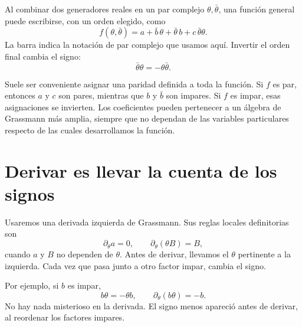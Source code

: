 Al combinar dos generadores reales en un par complejo \(\theta,\bar\theta\), una función general puede escribirse, con un orden elegido, como
\begin{equation}
f(\theta,\bar\theta)
=a+\bar b\,\theta+\bar\theta\,b+c\,\bar\theta\theta.
\end{equation}
La barra indica la notación de par complejo que usamos aquí. Invertir el orden final cambia el signo:
\begin{equation}
\bar\theta\theta=-\theta\bar\theta.
\end{equation}

Suele ser conveniente asignar una paridad definida a toda la función. Si \(f\) es par, entonces \(a\) y \(c\) son pares, mientras que \(b\) y \(\bar b\) son impares. Si \(f\) es impar, esas asignaciones se invierten. Los coeficientes pueden pertenecer a un álgebra de Grassmann más amplia, siempre que no dependan de las variables particulares respecto de las cuales desarrollamos la función.

\begin{classroomqa}
\end{classroomqa}

\section{Derivar es llevar la cuenta de los signos}

Usaremos una derivada izquierda de Grassmann. Sus reglas locales definitorias son
\begin{equation}
\partial_\theta a=0,
\qquad
\partial_\theta(\theta B)=B,
\end{equation}
cuando \(a\) y \(B\) no dependen de \(\theta\). Antes de derivar, llevamos el \(\theta\) pertinente a la izquierda. Cada vez que pasa junto a otro factor impar, cambia el signo.

Por ejemplo, si \(b\) es impar,
\begin{equation}
b\theta=-\theta b,
\qquad
\partial_\theta(b\theta)=-b.
\end{equation}
No hay nada misterioso en la derivada. El signo menos apareció antes de derivar, al reordenar los factores impares.

